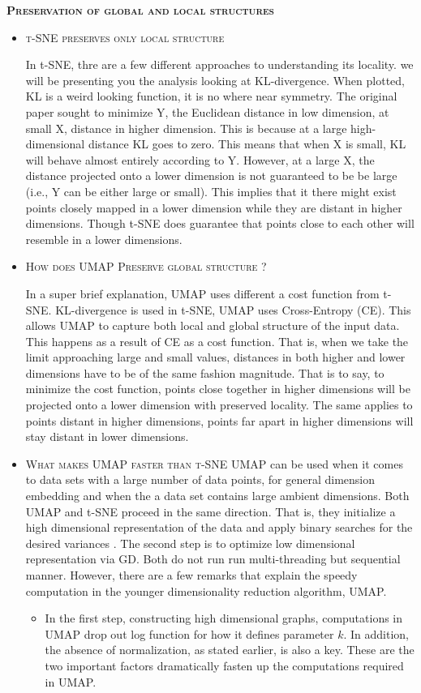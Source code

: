 \documentclass[a4paper, 11pt]{article}
\begin{document}
\textbf{\textsc{Preservation of global and local structures }}
\begin{itemize}

\item \textsc{t-SNE preserves only local structure}

In t-SNE, thre are a few different approaches to understanding its locality. we will be  presenting you the analysis looking at KL-divergence. When plotted, KL is a weird looking function, it is no where near symmetry. The original paper sought to minimize Y, the  Euclidean distance in low dimension, at small X, distance in higher dimension. This is because at a large high-dimensional distance KL goes to zero. This means that when X is small, KL will behave almost entirely  according to Y. However, at a large X, the distance projected onto a lower dimension is not guaranteed to be be large (i.e., Y can be either large or small). This implies that it there might exist points closely mapped in a lower dimension while they are distant in higher dimensions. Though t-SNE does guarantee that points close to each other will resemble in a lower dimensions.   

\item \textsc{How does UMAP Preserve  global structure ?} 

In a super brief explanation, UMAP uses  different a cost function  from t-SNE. KL-divergence is used in t-SNE, UMAP uses Cross-Entropy (CE). This allows UMAP to capture both local and  global structure of the input data. This happens as a result of CE as a cost function. That is, when we take the limit approaching large and small values, distances in both higher and lower dimensions have to be of the same fashion magnitude. That is to say, to minimize the cost function, points close together in higher  dimensions will be projected onto a lower dimension with preserved locality. The same applies to points distant in  higher dimensions,  points far apart in higher dimensions will stay distant in lower dimensions. 

\item \textsc{What makes UMAP faster than t-SNE} 
UMAP can be used when it comes to data sets with a large number of data points, for general dimension embedding and when the a data set contains large ambient dimensions. Both UMAP and t-SNE proceed in the same direction. That is, they initialize a high dimensional representation of the data and apply binary searches for the desired variances . The second step is to optimize low dimensional representation via GD. Both do not run run multi-threading but sequential  manner. However, there are a few remarks that explain the speedy computation in the younger dimensionality reduction algorithm, UMAP. 
\begin{itemize}
\item In the first step, constructing high dimensional graphs,  computations in UMAP drop out log function for how it defines parameter $k$. In addition, the absence of normalization, as stated earlier, is also a key. These are the two important factors dramatically fasten up the computations  required in  UMAP.


\end{itemize}
\end{itemize}
\end{document}
